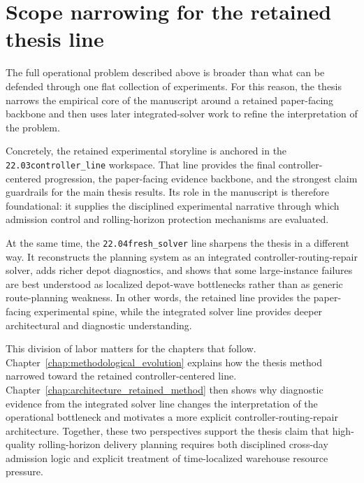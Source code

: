 \section{Scope narrowing for the retained thesis line}

The full operational problem described above is broader than what can be defended through one flat collection of experiments. For this reason, the thesis narrows the empirical core of the manuscript around a retained paper-facing backbone and then uses later integrated-solver work to refine the interpretation of the problem.

Concretely, the retained experimental storyline is anchored in the \texttt{22.03controller\_line} workspace. That line provides the final controller-centered progression, the paper-facing evidence backbone, and the strongest claim guardrails for the main thesis results. Its role in the manuscript is therefore foundational: it supplies the disciplined experimental narrative through which admission control and rolling-horizon protection mechanisms are evaluated.

At the same time, the \texttt{22.04fresh\_solver} line sharpens the thesis in a different way. It reconstructs the planning system as an integrated controller-routing-repair solver, adds richer depot diagnostics, and shows that some large-instance failures are best understood as localized depot-wave bottlenecks rather than as generic route-planning weakness. In other words, the retained line provides the paper-facing experimental spine, while the integrated solver line provides deeper architectural and diagnostic understanding.

This division of labor matters for the chapters that follow. Chapter~\ref{chap:methodological_evolution} explains how the thesis method narrowed toward the retained controller-centered line. Chapter~\ref{chap:architecture_retained_method} then shows why diagnostic evidence from the integrated solver line changes the interpretation of the operational bottleneck and motivates a more explicit controller-routing-repair architecture. Together, these two perspectives support the thesis claim that high-quality rolling-horizon delivery planning requires both disciplined cross-day admission logic and explicit treatment of time-localized warehouse resource pressure.
